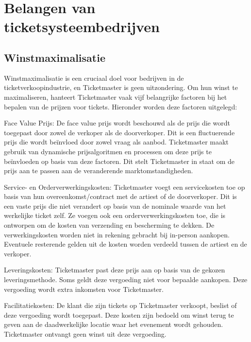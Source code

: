 
\section{Belangen van ticketsysteembedrijven}



\subsection{Winstmaximalisatie}
Winstmaximalisatie is een cruciaal doel voor bedrijven in de ticketverkoopindustrie, en Ticketmaster is geen uitzondering. Om hun winst te maximaliseren, hanteert Ticketmaster vaak vijf belangrijke factoren bij het bepalen van de prijzen voor tickets. Hieronder worden deze factoren uitgelegd:

\vspace{5 mm}

Face Value Prijs: De face value prijs wordt beschouwd als de prijs die wordt toegepast door zowel de verkoper als de doorverkoper. Dit is een fluctuerende prijs die wordt beïnvloed door zowel vraag als aanbod. Ticketmaster maakt gebruik van dynamische prijsalgoritmen en processen om deze prijs te beïnvloeden op basis van deze factoren. Dit stelt Ticketmaster in staat om de prijs aan te passen aan de veranderende marktomstandigheden.

Service- en Orderverwerkingskosten: Ticketmaster voegt een servicekosten toe op basis van hun overeenkomst/contract met de artiest of de doorverkoper. Dit is een vaste prijs die niet verandert op basis van de nominale waarde van het werkelijke ticket zelf. Ze voegen ook een orderverwerkingskosten toe, die is ontworpen om de kosten van verzending en bescherming te dekken. De verwerkingskosten worden niet in rekening gebracht bij in-person aankopen. Eventuele resterende gelden uit de kosten worden verdeeld tussen de artiest en de verkoper.

Leveringskosten: Ticketmaster past deze prijs aan op basis van de gekozen leveringsmethode. Soms geldt deze vergoeding niet voor bepaalde aankopen. Deze vergoeding wordt extra inkomsten voor Ticketmaster.

Facilitatiekosten: De klant die zijn tickets op Ticketmaster verkoopt, beslist of deze vergoeding wordt toegepast. Deze kosten zijn bedoeld om winst terug te geven aan de daadwerkelijke locatie waar het evenement wordt gehouden. Ticketmaster ontvangt geen winst uit deze vergoeding.

